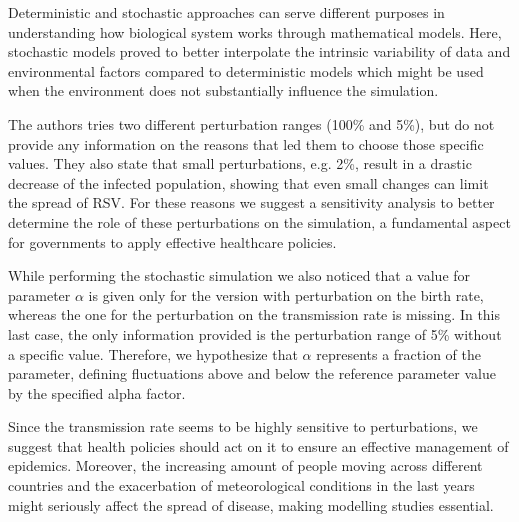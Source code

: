 Deterministic and stochastic approaches can serve different purposes in understanding how biological system works through mathematical models. Here, stochastic models proved to better interpolate the intrinsic variability of data and environmental factors compared to deterministic models which might be used when the environment does not substantially influence the simulation.\par
The authors tries two different perturbation ranges (100\% and 5\%), but do not provide any information on the reasons that led them to choose those specific values. They also state that small perturbations, e.g. 2\%, result in a drastic decrease of the infected population, showing that even small changes can limit the spread of RSV. For these reasons we suggest a sensitivity analysis to better determine the role of these perturbations on the simulation, a fundamental aspect for governments to apply effective healthcare policies.\par
While performing the stochastic simulation we also noticed that a value for parameter $\alpha$ is given only for the version with perturbation on the birth rate, whereas the one for the perturbation on the transmission rate is missing. In this last case, the only information provided is the perturbation range of 5\% without a specific value. Therefore, we hypothesize that $\alpha$ represents a fraction of the parameter, defining fluctuations above and below the reference parameter value by the specified alpha factor.\par
Since the transmission rate seems to be highly sensitive to perturbations, we suggest that health policies should act on it to ensure an effective management of epidemics. Moreover, the increasing amount of people moving across different countries and the exacerbation of meteorological conditions in the last years might seriously affect the spread of disease, making modelling studies essential.